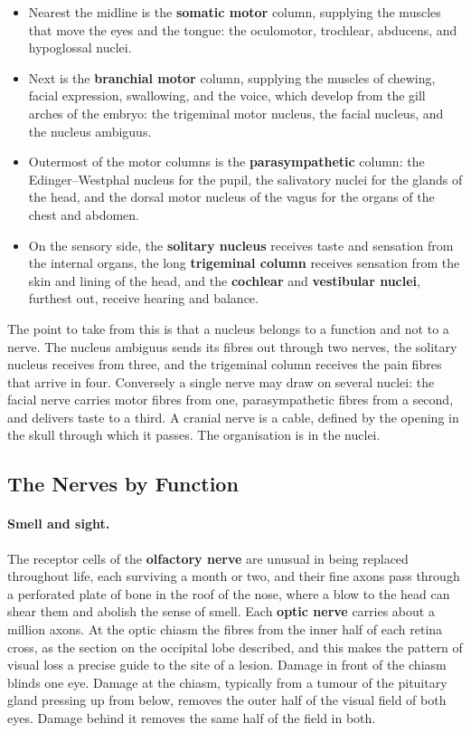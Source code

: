 \documentclass[11pt]{article}
\begin{document}
\begin{itemize}
    \item Nearest the midline is the \textbf{somatic motor} column, supplying the muscles that move the eyes and the tongue: the oculomotor, trochlear, abducens, and hypoglossal nuclei.
    \item Next is the \textbf{branchial motor} column, supplying the muscles of chewing, facial expression, swallowing, and the voice, which develop from the gill arches of the embryo: the trigeminal motor nucleus, the facial nucleus, and the nucleus ambiguus.
    \item Outermost of the motor columns is the \textbf{parasympathetic} column: the Edinger--Westphal nucleus for the pupil, the salivatory nuclei for the glands of the head, and the dorsal motor nucleus of the vagus for the organs of the chest and abdomen.
    \item On the sensory side, the \textbf{solitary nucleus} receives taste and sensation from the internal organs, the long \textbf{trigeminal column} receives sensation from the skin and lining of the head, and the \textbf{cochlear} and \textbf{vestibular nuclei}, furthest out, receive hearing and balance.
\end{itemize}

The point to take from this is that a nucleus belongs to a function and not to a nerve. The nucleus ambiguus sends its fibres out through two nerves, the solitary nucleus receives from three, and the trigeminal column receives the pain fibres that arrive in four. Conversely a single nerve may draw on several nuclei: the facial nerve carries motor fibres from one, parasympathetic fibres from a second, and delivers taste to a third. A cranial nerve is a cable, defined by the opening in the skull through which it passes. The organisation is in the nuclei.

\subsection{The Nerves by Function}

\paragraph{Smell and sight.} The receptor cells of the \textbf{olfactory nerve} are unusual in being replaced throughout life, each surviving a month or two, and their fine axons pass through a perforated plate of bone in the roof of the nose, where a blow to the head can shear them and abolish the sense of smell. Each \textbf{optic nerve} carries about a million axons. At the optic chiasm the fibres from the inner half of each retina cross, as the section on the occipital lobe described, and this makes the pattern of visual loss a precise guide to the site of a lesion. Damage in front of the chiasm blinds one eye. Damage at the chiasm, typically from a tumour of the pituitary gland pressing up from below, removes the outer half of the visual field of both eyes. Damage behind it removes the same half of the field in both.
\end{document}
